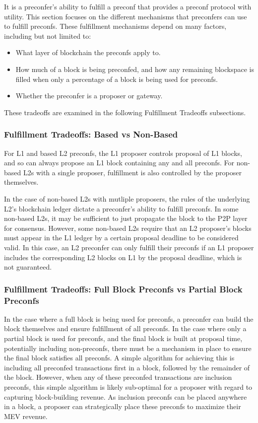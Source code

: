 \documentclass[a4paper]{article}
\theoremstyle{boldstyle}
\begin{document}
It is a preconfer's ability to fulfill a preconf that provides a preconf protocol with utility. This section focuses on the different mechanisms that preconfers can use to fulfill preconfs. These fulfillment mechanisms depend on many factors, including but not limited to:
\begin{itemize}
    \item What layer of blockchain the preconfs apply to.
    \item How much of a block is being preconfed, and how any remaining blockspace is filled when only a percentage of a block is being used for preconfs.
    \item Whether the preconfer is a proposer or gateway.
\end{itemize} 
These tradeoffs are examined in the following Fulfillment Tradeoffs subsections.

\subsubsection{Fulfillment Tradeoffs: Based vs Non-Based}

For L1 and based L2 preconfs, the L1 proposer controls proposal of L1 blocks, and so can always propose an L1 block containing any and all preconfs. For non-based L2s with a single proposer, fulfillment is also controlled by the proposer themselves. 

In the case of non-based L2s with mutliple proposers, the rules of the underlying L2's blockchain ledger dictate a preconfer's ability to fulfill preconfs. In some non-based L2s, it may be sufficient to just propagate the block to the P2P layer for consensus. However, some non-based L2s require that an L2 proposer's blocks must appear in the L1 ledger by a certain proposal deadline to be considered valid. In this case, an L2 preconfer can only fulfill their preconfs if an L1 proposer includes the corresponding L2 blocks on L1 by the proposal deadline, which is not guaranteed. 

\subsubsection{Fulfillment Tradeoffs: Full Block Preconfs vs Partial Block Preconfs}

In the case where a full block is being used for preconfs, a preconfer can build the block themselves and ensure fulfillment of all preconfs. In the case where only a partial block is used for preconfs, and the final block is built at proposal time, potentially including non-preconfs, there must be a mechanism in place to ensure the final block satisfies all preconfs. A simple algorithm for achieving this is including all preconfed transactions first in a block, followed by the remainder of the block. However, when any of these preconfed transactions are inclusion preconfs, this simple algorithm is likely sub-optimal for a proposer with regard to capturing block-building revenue. As inclusion preconfs can be placed anywhere in a block, a proposer can strategically place these preconfs to maximize their MEV revenue. 
\end{document}
